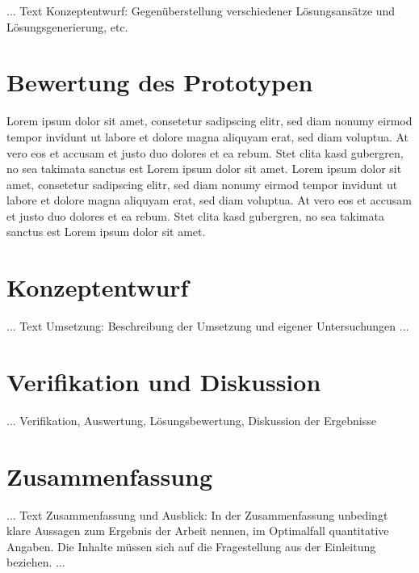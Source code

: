 ... Text Konzeptentwurf: Gegenüberstellung verschiedener Lösungsansätze und Lösungsgenerierung, etc.

\chapter{Bewertung des Prototypen}
\label{cha:Bewertung}
Lorem ipsum dolor sit amet, consetetur sadipscing elitr, sed diam nonumy eirmod tempor invidunt ut labore et dolore magna aliquyam erat, sed diam voluptua. At vero eos et accusam et justo duo dolores et ea rebum. Stet clita kasd gubergren, no sea takimata sanctus est Lorem ipsum dolor sit amet. Lorem ipsum dolor sit amet, consetetur sadipscing elitr, sed diam nonumy eirmod tempor invidunt ut labore et dolore magna aliquyam erat, sed diam voluptua. At vero eos et accusam et justo duo dolores et ea rebum. Stet clita kasd gubergren, no sea takimata sanctus est Lorem ipsum dolor sit amet.

\chapter{Konzeptentwurf}
\label{cha:Konzeptentwurf}

... Text Umsetzung: Beschreibung der Umsetzung und eigener Untersuchungen ...



\chapter{Verifikation und Diskussion}
\label{cha:Verifikation}

... Verifikation, Auswertung, Lösungsbewertung, Diskussion der Ergebnisse

\chapter{Zusammenfassung}
\label{cha:zusammenfassung}

... Text Zusammenfassung und Ausblick: In der Zusammenfassung unbedingt klare Aussagen zum Ergebnis der Arbeit nennen, im Optimalfall quantitative Angaben. Die Inhalte müssen sich auf die Fragestellung aus der Einleitung  beziehen. ...